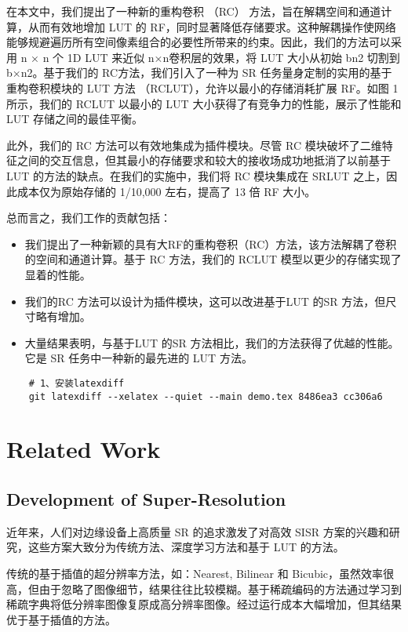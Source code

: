 \documentclass[a4paper]{article}
\begin{document}
在本文中，我们提出了一种新的重构卷积 （RC） 方法，旨在解耦空间和通道计算，从而有效地增加 LUT 的 RF，同时显著降低存储要求。这种解耦操作使网络能够规避遍历所有空间像素组合的必要性所带来的约束。因此，我们的方法可以采用 n × n 个 1D LUT 来近似 n×n卷积层的效果，将 LUT 大小从初始 bn2 切割到 b×n2。基于我们的 RC方法，我们引入了一种为 SR 任务量身定制的实用的基于重构卷积模块的 LUT 方法 （RCLUT），允许以最小的存储消耗扩展 RF。如图 1 所示，我们的 RCLUT 以最小的 LUT 大小获得了有竞争力的性能，展示了性能和 LUT 存储之间的最佳平衡。


此外，我们的 RC 方法可以有效地集成为插件模块。尽管 RC 模块破坏了二维特征之间的交互信息，但其最小的存储要求和较大的接收场成功地抵消了以前基于 LUT 的方法的缺点。在我们的实施中，我们将 RC 模块集成在 SRLUT 之上，因此成本仅为原始存储的 1/10,000 左右，提高了 13 倍 RF 大小。



总而言之，我们工作的贡献包括： 
\begin{itemize}
\item 我们提出了一种新颖的具有大RF的重构卷积（RC）方法，该方法解耦了卷积的空间和通道计算。基于 RC 方法，我们的 RCLUT 模型以更少的存储实现了显着的性能。 
\item 我们的RC 方法可以设计为插件模块，这可以改进基于LUT 的SR 方法，但尺寸略有增加。 
\item 大量结果表明，与基于LUT 的SR 方法相比，我们的方法获得了优越的性能。它是 SR 任务中一种新的最先进的 LUT 方法。
\end{itemize}


\begin{lstlisting}
    # 1、安装latexdiff
    git latexdiff --xelatex --quiet --main demo.tex 8486ea3 cc306a6
\end{lstlisting}



\section{Related Work}
\subsection{Development of Super-Resolution}
近年来，人们对边缘设备上高质量 SR 的追求激发了对高效 SISR 方案的兴趣和研究，这些方案大致分为传统方法、深度学习方法和基于 LUT 的方法。

传统的基于插值的超分辨率方法，如：Nearest, Bilinear 和 Bicubic，虽然效率很高，但由于忽略了图像细节，结果往往比较模糊。基于稀疏编码的方法通过学习到稀疏字典将低分辨率图像复原成高分辨率图像。经过运行成本大幅增加，但其结果优于基于插值的方法。
\end{document}
